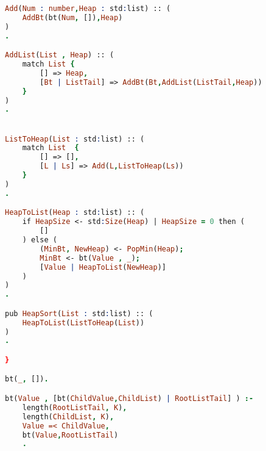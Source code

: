 \begin{lstlisting}[language = Prolog]
Add(Num : number,Heap : std:list) :: (
    AddBt(bt(Num, []),Heap)
)
.

AddList(List , Heap) :: (
    match List {
        [] => Heap,
        [Bt | ListTail] => AddBt(Bt,AddList(ListTail,Heap))
    }
)
.


ListToHeap(List : std:list) :: (
    match List  {
        [] => [],
        [L | Ls] => Add(L,ListToHeap(Ls))
    }
)
.

HeapToList(Heap : std:list) :: (
    if HeapSize <- std:Size(Heap) | HeapSize = 0 then (
        []
    ) else (
        (MinBt, NewHeap) <- PopMin(Heap);
        MinBt <- bt(Value , _);
        [Value | HeapToList(NewHeap)]
    )
)
.

pub HeapSort(List : std:list) :: (
    HeapToList(ListToHeap(List))
)
.

}

bt(_, []).

bt(Value , [bt(ChildValue,ChildList) | RootListTail] ) :- 
    length(RootListTail, K), 
    length(ChildList, K),
    Value =< ChildValue,
    bt(Value,RootListTail)
    .
\end{lstlisting}


